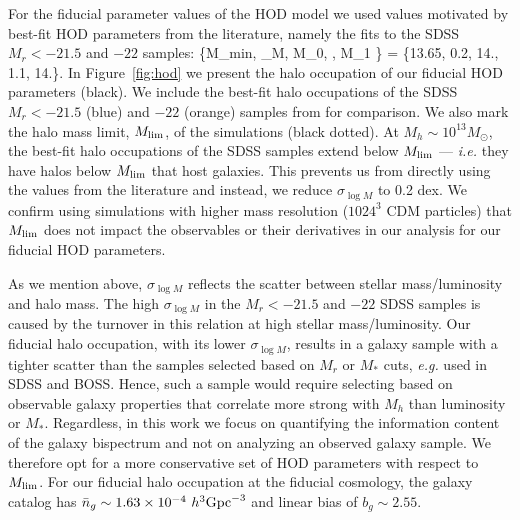 For the fiducial parameter values of the HOD model we used values motivated by 
best-fit HOD parameters from the literature, namely the \cite{zheng2007} 
fits to the SDSS $M_r < -21.5$  and $-22$ samples: 
\beq \label{eq:hod_fid}
\{M_{\rm min}, \sigma_{\log M}, \log M_0, \alpha, \log M_1 \} = \{13.65, 0.2, 14., 1.1, 14.\}.
\eeq
In Figure~\ref{fig:hod} we present the halo occupation of our fiducial 
HOD parameters (black). We include the best-fit halo occupations of 
the SDSS $M_r < -21.5$ (blue)  and $-22$ (orange) samples from \cite{zheng2007}
for comparison. We also mark the halo mass limit, $M_{\rm lim}$, of the \quij 
simulations (black dotted). At $M_h \sim 10^{13} M_\odot$, the best-fit halo 
occupations of the SDSS samples extend below $M_{\rm lim}$ --- \emph{i.e.} 
they have halos below $M_{\rm lim}$ that host galaxies. This prevents us from 
directly using the values from the literature and instead, we reduce 
$\sigma_{\log M}$ to 0.2 dex. We confirm using \quij simulations with higher 
mass resolution ($1024^3$ CDM particles) that $M_{\rm lim}$ does not impact
the observables or their derivatives in our analysis for our fiducial HOD 
parameters. 

As we mention above, $\sigma_{\log M}$ reflects the scatter between stellar 
mass/luminosity and halo mass. The high $\sigma_{\log M}$ in the $M_r < -21.5$ 
and $-22$ SDSS samples is caused by the turnover in this relation at high stellar 
mass/luminosity. Our fiducial halo occupation, with its lower $\sigma_{\log M}$, 
results in a galaxy sample with a tighter scatter than the samples selected based 
on $M_r$ or $M_*$ cuts, \emph{e.g.} used in SDSS and BOSS. Hence, such a sample
would require selecting based on observable galaxy properties that correlate 
more strong with $M_h$ than luminosity or $M_*$.  Regardless, in this work
we focus on quantifying the information content of the galaxy bispectrum 
and not on analyzing an observed galaxy sample. We therefore opt for a more 
conservative set of HOD parameters with respect to $M_{\rm lim}$. For our
fiducial halo occupation at the fiducial cosmology, the galaxy catalog has 
$\bar{n}_g \sim 1.63\times 10^{-4}~h^3{\rm Gpc}^{-3}$ and linear bias of 
$b_g \sim 2.55$.

